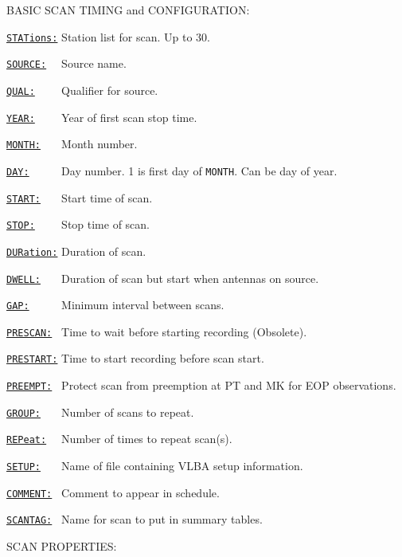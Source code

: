 \documentclass{report}
\newcommand{\htlm}[2]%
{\item
  \hyperref[MP:#1]{{\tt #1:}}{\tt #2}%
}
\newcommand{\htln}[3]%
{\item
  \hyperref[MP:#2]{{\tt #1:}}{\tt #3}%
}
\begin{document}
BASIC SCAN TIMING and CONFIGURATION:

\begin{list}{}{\parsep 0em  \itemsep 0em }
\htln{STATions}{STATIONS}{} Station list for scan. Up to 30.
\htlm{SOURCE}{~~} Source name.
\htlm{QUAL}{~~~~} Qualifier for source.
\htlm{YEAR}{~~~~} Year of first scan stop time.
\htlm{MONTH}{~~~} Month number.
\htlm{DAY}{~~~~~} Day number. 1 is first day of {\tt MONTH}. Can
                        be day of year.
\htlm{START}{~~~} Start time of scan.
\htlm{STOP}{~~~~} Stop time of scan.
\htln{DURation}{DUR}{} Duration of scan.
\htlm{DWELL}{~~~} Duration of scan but start when antennas on
                        source.
\htlm{GAP}{~~~~~} Minimum interval between scans.
\htlm{PRESCAN}{~} Time to wait before starting recording (Obsolete).
\htlm{PRESTART}{} Time to start recording before scan start.
\htlm{PREEMPT}{~} Protect scan from preemption at PT and MK for EOP observations.
\htlm{GROUP}{~~~} Number of scans to repeat.
\htln{REPeat}{REPEAT}{~~} Number of times to repeat scan(s).
\htlm{SETUP}{~~~} Name of file containing VLBA setup information.
\htlm{COMMENT}{~} Comment to appear in schedule.
\htlm{SCANTAG}{~} Name for scan to put in summary tables.
\end{list}

SCAN PROPERTIES:
\end{document}
